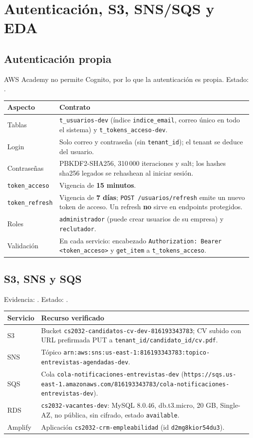 \section{Autenticación, S3, SNS/SQS y EDA}
\subsection{Autenticación propia}
AWS Academy no permite Cognito, por lo que la autenticación es propia. Estado: \cumple.
\begin{longtable}{p{4cm}p{10cm}}
\toprule
\textbf{Aspecto} & \textbf{Contrato} \\
\midrule
\endhead
Tablas & \texttt{t\_usuarios-dev} (índice \texttt{indice\_email}, correo único en todo el sistema) y \texttt{t\_tokens\_acceso-dev}. \\
Login & Solo correo y contraseña (sin \texttt{tenant\_id}); el tenant se deduce del usuario. \\
Contraseñas & PBKDF2-SHA256, 310\,000 iteraciones y salt; los hashes sha256 legados se rehashean al iniciar sesión. \\
\texttt{token\_acceso} & Vigencia de \textbf{15 minutos}. \\
\texttt{token\_refresh} & Vigencia de \textbf{7 días}; \texttt{POST /usuarios/refresh} emite un nuevo token de acceso. Un refresh \textbf{no} sirve en endpoints protegidos. \\
Roles & \texttt{administrador} (puede crear usuarios de su empresa) y \texttt{reclutador}. \\
Validación & En cada servicio: encabezado \texttt{Authorization: Bearer <token\_acceso>} y \texttt{get\_item} a \texttt{t\_tokens\_acceso}. \\
\bottomrule
\end{longtable}

\subsection{S3, SNS y SQS}
Evidencia: . Estado: \cumple.
\begin{longtable}{p{2.2cm}p{11.6cm}}
\toprule
\textbf{Servicio} & \textbf{Recurso verificado} \\
\midrule
\endhead
S3 & Bucket \texttt{cs2032-candidatos-cv-dev-816193343783}; CV subido con URL prefirmada PUT a \texttt{tenant\_id/candidato\_id/cv.pdf}. \\
SNS & Tópico \texttt{arn:aws:sns:us-east-1:816193343783:topico-entrevistas-agendadas-dev}. \\
SQS & Cola \texttt{cola-notificaciones-entrevistas-dev} (\texttt{https://sqs.us-east-1.amazonaws.com/816193343783/cola-notificaciones-entrevistas-dev}). \\
RDS & \texttt{cs2032-vacantes-dev}: MySQL 8.0.46, db.t3.micro, 20 GB, Single-AZ, no pública, sin cifrado, estado \texttt{available}. \\
Amplify & Aplicación \texttt{cs2032-crm-empleabilidad} (id \texttt{d2mg8kior54du3}). \\
\bottomrule
\end{longtable}

